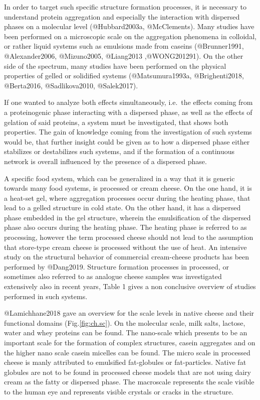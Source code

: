 \documentclass[
]{article}
\begin{document}
In order to target such specific structure formation processes, it is
necessary to understand protein aggregation and especially the
interaction with dispersed phases on a molecular level (@Hubbard2003a,
@McClements). Many studies have been performed on a microscopic scale on
the aggregation phenomena in colloidal, or rather liquid systems such as
emulsions made from caseins (@Brunner1991, @Alexander2006, @Mizuno2005,
@Liang2013 ,@WONG201291). On the other side of the spectrum, many
studies have been performed on the physical properties of gelled or
solidified systems (@Matsumura1993a, @Brighenti2018, @Berta2016,
@Sadlikova2010, @Salek2017).

If one wanted to analyze both effects simultaneously, i.e.~the effects
coming from a proteinogenic phase interacting with a dispersed phase, as
well as the effects of gelation of said proteins, a system must be
investigated, that shows both properties. The gain of knowledge coming
from the investigation of such systems would be, that further insight
could be given as to how a dispersed phase either stabilizes or
destabilizes such systems, and if the formation of a continuous network
is overall influenced by the presence of a dispersed phase.

A specific food system, which can be generalized in a way that it is
generic towards many food systems, is processed or cream cheese. On the
one hand, it is a heat-set gel, where aggregation processes occur during
the heating phase, that lead to a gelled structure in cold state. On the
other hand, it has a dispersed phase embedded in the gel structure,
wherein the emulsification of the dispersed phase also occurs during the
heating phase. The heating phase is referred to as processing, however
the term processed cheese should not lead to the assumption that
store-type cream cheese is processed without the use of heat. An
intensive study on the structural behavior of commercial cream-cheese
products has been performed by @Dang2019. Structure formation processes
in processed, or sometimes also referred to as analogue cheese samples
was investigated extensively also in recent years, Table 1 gives a non
conclusive overview of studies performed in such systems.

@Lamichhane2018 gave an overview for the scale levels in native cheese
and their functional domains (Fig.\ref{fig:ch.sc}). On the molecular
scale, milk salts, lactose, water and whey proteins can be found. The
nano-scale which presents to be an important scale for the formation of
complex structures, casein aggregates and on the higher nano scale
casein micelles can be found. The micro scale in processed cheese is
manly attributed to emulsified fat-globules or fat-particles. Native fat
globules are not to be found in processed cheese models that are not
using dairy cream as the fatty or dispersed phase. The macroscale
represents the scale visible to the human eye and represents visible
crystals or cracks in the structure.
\end{document}
